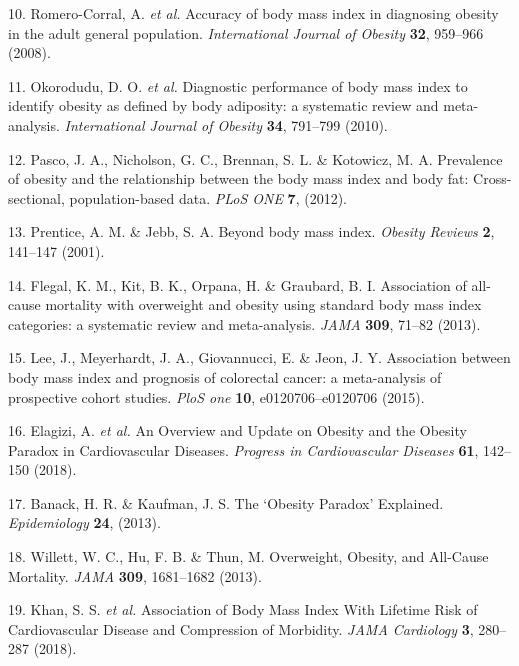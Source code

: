 \documentclass[11pt,twoside]{bristolthesis}
\begin{document}
\leavevmode\hypertarget{ref-Romero-Corral2008}{}%
10. Romero-Corral, A. \emph{et al.} Accuracy of body mass index in diagnosing obesity in the adult general population. \emph{International Journal of Obesity} \textbf{32}, 959--966 (2008).

\leavevmode\hypertarget{ref-Okorodudu2010}{}%
11. Okorodudu, D. O. \emph{et al.} Diagnostic performance of body mass index to identify obesity as defined by body adiposity: a systematic review and meta-analysis. \emph{International Journal of Obesity} \textbf{34}, 791--799 (2010).

\leavevmode\hypertarget{ref-Pasco2012}{}%
12. Pasco, J. A., Nicholson, G. C., Brennan, S. L. \& Kotowicz, M. A. Prevalence of obesity and the relationship between the body mass index and body fat: Cross-sectional, population-based data. \emph{PLoS ONE} \textbf{7}, (2012).

\leavevmode\hypertarget{ref-Prentice2001}{}%
13. Prentice, A. M. \& Jebb, S. A. Beyond body mass index. \emph{Obesity Reviews} \textbf{2}, 141--147 (2001).

\leavevmode\hypertarget{ref-Flegal2013}{}%
14. Flegal, K. M., Kit, B. K., Orpana, H. \& Graubard, B. I. Association of all-cause mortality with overweight and obesity using standard body mass index categories: a systematic review and meta-analysis. \emph{JAMA} \textbf{309}, 71--82 (2013).

\leavevmode\hypertarget{ref-Lee2015}{}%
15. Lee, J., Meyerhardt, J. A., Giovannucci, E. \& Jeon, J. Y. Association between body mass index and prognosis of colorectal cancer: a meta-analysis of prospective cohort studies. \emph{PloS one} \textbf{10}, e0120706--e0120706 (2015).

\leavevmode\hypertarget{ref-Elagizi2018}{}%
16. Elagizi, A. \emph{et al.} An Overview and Update on Obesity and the Obesity Paradox in Cardiovascular Diseases. \emph{Progress in Cardiovascular Diseases} \textbf{61}, 142--150 (2018).

\leavevmode\hypertarget{ref-Banack2013}{}%
17. Banack, H. R. \& Kaufman, J. S. The `Obesity Paradox' Explained. \emph{Epidemiology} \textbf{24}, (2013).

\leavevmode\hypertarget{ref-Willett2013}{}%
18. Willett, W. C., Hu, F. B. \& Thun, M. Overweight, Obesity, and All-Cause Mortality. \emph{JAMA} \textbf{309}, 1681--1682 (2013).

\leavevmode\hypertarget{ref-Khan2018}{}%
19. Khan, S. S. \emph{et al.} Association of Body Mass Index With Lifetime Risk of Cardiovascular Disease and Compression of Morbidity. \emph{JAMA Cardiology} \textbf{3}, 280--287 (2018).
\end{document}
